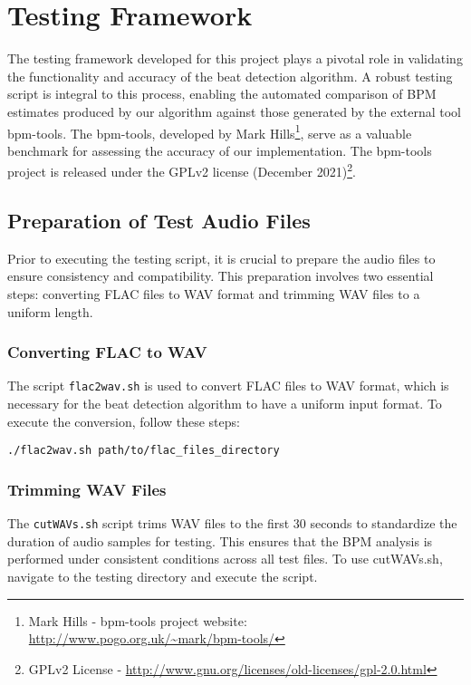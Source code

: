 \section{Testing Framework}

The testing framework developed for this project plays a pivotal role in validating the functionality and accuracy of the beat detection algorithm. A robust testing script is integral to this process, enabling the automated comparison of BPM estimates produced by our algorithm against those generated by the external tool bpm-tools. The bpm-tools, developed by Mark Hills\footnote{Mark Hills - bpm-tools project website: \url{http://www.pogo.org.uk/~mark/bpm-tools/}}, serve as a valuable benchmark for assessing the accuracy of our implementation. The bpm-tools project is released under the GPLv2 license (December 2021)\footnote{GPLv2 License - \url{http://www.gnu.org/licenses/old-licenses/gpl-2.0.html}}.

\subsection{Preparation of Test Audio Files}

Prior to executing the testing script, it is crucial to prepare the audio files to ensure consistency and compatibility. This preparation involves two essential steps: converting FLAC files to WAV format and trimming WAV files to a uniform length.

\subsubsection{Converting FLAC to WAV}

The script \texttt{flac2wav.sh} is used to convert FLAC files to WAV format, which is necessary for the beat detection algorithm to have a uniform input format. To execute the conversion, follow these steps:

\lstset{style=ShellStyle}
\begin{lstlisting}[caption={Converting FLAC to WAV}, label=lst]
./flac2wav.sh path/to/flac_files_directory
\end{lstlisting}

\subsubsection{Trimming WAV Files}

The \texttt{cutWAVs.sh} script trims WAV files to the first 30 seconds to standardize the duration of audio samples for testing. This ensures that the BPM analysis is performed under consistent conditions across all test files. To use cutWAVs.sh, navigate to the testing directory and execute the script.

